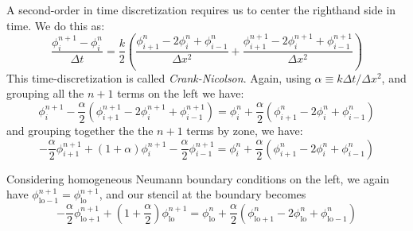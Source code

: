A second-order in time discretization requires us to center the righthand side in time.  We
do this as:
\begin{equation}
\frac{\phi_i^{n+1} - \phi_i^n}{\Delta t} = 
  \frac{k}{2} \left ( \frac{\phi_{i+1}^{n} - 2\phi_i^{n} + \phi_{i-1}^{n}}{\Delta x^2} +
                      \frac{\phi_{i+1}^{n+1} - 2\phi_i^{n+1} + \phi_{i-1}^{n+1}}{\Delta x^2} \right )
\end{equation}
This time-discretization is called  {\em Crank-Nicolson}.
Again, using $\alpha \equiv k\Delta t / \Delta x^2$, and grouping all the $n+1$ terms on the left
we have:
\begin{equation}
\phi^{n+1}_i - \frac{\alpha}{2} \left ( \phi^{n+1}_{i+1} - 2\phi^{n+1}_i + \phi^{n+1}_{i-1} \right )
  = \phi^n_i + \frac{\alpha}{2} \left ( \phi^{n}_{i+1} - 2\phi^{n}_i + \phi^{n}_{i-1} \right )
\end{equation}
and grouping together the the $n+1$ terms by zone, we have:
\begin{equation}
-\frac{\alpha}{2} \phi^{n+1}_{i+1} + (1 + \alpha)\phi^{n+1}_i - \frac{\alpha}{2} \phi^{n+1}_{i-1}
  = \phi^n_i + \frac{\alpha}{2} \left ( \phi^n_{i+1} - 2 \phi^n_i + \phi^n_{i-1} \right )
\end{equation}

Considering homogeneous Neumann boundary conditions on the left, we again have
$\phi^{n+1}_\mathrm{lo-1} = \phi^{n+1}_\mathrm{lo}$, and our stencil at the boundary 
becomes
\begin{equation}
-\frac{\alpha}{2} \phi^{n+1}_\mathrm{lo+1} + \left (1 + \frac{\alpha}{2} \right ) \phi^{n+1}_\mathrm{lo} =
    \phi^n_\mathrm{lo} + \frac{\alpha}{2} \left ( \phi^{n}_\mathrm{lo+1} - 2\phi^{n}_\mathrm{lo} + \phi^{n}_\mathrm{lo-1} \right )
\end{equation}


